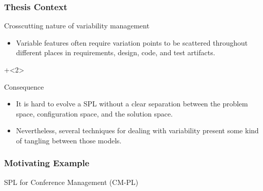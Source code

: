 \documentclass[xcolor=svgnames]{beamer}
\begin{document}
\begin{frame}
\frametitle{Thesis Context}

\begin{block}{Crosscutting nature of variability management}
\begin{itemize}
	\item Variable features often require variation points to be scattered
	throughout different places in requirements, design, code, and test artifacts.
\end{itemize}
\end{block}

\onslide+<2>
\begin{block}{Consequence}
\begin{itemize}
   \item It is hard to evolve a SPL without a clear
  separation between the problem space, configuration space, and the solution space.
   \item Nevertheless, several techniques for dealing with
  variability present some kind of tangling between those models.    
\end{itemize}
\end{block}
\end{frame}


\begin{frame}
\frametitle{Motivating Example}
\begin{block}{SPL for Conference Management (CM-PL)}
\end{block}
\end{frame}
\end{document}
